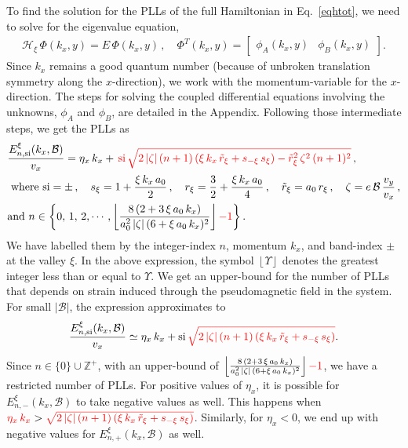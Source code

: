 \documentclass[aps,prb, onecolumn, nofootinbib, citeautoscript,10pt]{revtex4-2}
\newcommand{\red}[1]{{\color{red}#1}}
\def \nn{\nonumber \\}
\begin{document}
To find the solution for the PLLs of the full Hamiltonian in Eq.~\eqref{eqhtot}, we need to solve for the eigenvalue equation,
\begin{align}
\mathcal{H}_{\xi} \,\Phi (k_x, y) = E \,\Phi (k_x, y)\,,\quad
\Phi^T (k_x, y) = \begin{bmatrix}
\phi_A (k_x, y) & \phi_B(k_x, y) 
\end{bmatrix} .
\end{align}
Since $k_x$ remains a good quantum number (because of unbroken translation symmetry along the $x$-direction), we work with the momentum-variable for the $x$-direction. The steps for solving the coupled differential equations involving the unknowns, $\phi_A$ and $\phi_B$, are detailed in the Appendix. Following those intermediate steps, we get the PLLs as
\begin{align}
& \frac{  E^{\xi}_{n, \rm{si}} (k_x, \mathcal B) } {v_x} =  
\eta_x \,   k_x
+ \,\red{\text{si}\,\sqrt{ 2\,|\zeta|\,(n+1) \left (\xi\,k_x \, \tilde r_\xi + s_{-\xi} \, s_\xi \right ) - \tilde r_\xi^2 \, \zeta^2\,(n+1)^2 }}  \,,\nn
& \text{ where } \text{si} = \pm \,, \quad
s_\xi = 1 + \frac{\xi \, k_x\, a_0 } {2}\,, \quad
r_\xi = \frac{3}{2} + \frac{\xi \, k_x\, a_0 } {4}\,,\quad
\tilde{r}_\xi = a_0 \, r_\xi  \,, \quad \zeta =  e \, {\mathcal B} \, \frac{v_y}{v_x}\,,
\nn & \text{and } n \in \left\{ 0, \,1, \, 2,\cdots, 
\left\lfloor\frac{8 \,(2  + 3 \, \xi \,a_0\, k_x)}   { a_0^2\,|\zeta| \,(6 +\xi \,a_0\,  k_x)^2} \right\rfloor \red{- 1} \right\}.
\label{eqevals}
\end{align}
We have labelled them by the integer-index $n$, momentum $k_x$, and band-index $\pm$ at the valley $\xi$. 
In the above expression, the symbol $\left \lfloor  \Upsilon \right \rfloor$ denotes the greatest integer less than or equal to $\Upsilon$.
We get an upper-bound for the number of PLLs that depends on strain induced through the \red{pseudomagnetic} field in the system. For small $ |\mathcal{B}| $, the expression approximates to
\begin{align}
\frac{ E^{\xi}_{n, \rm{si}} (k_x, \mathcal B) } {v_x} \simeq    \eta_x \,   k_x 
+ \text{si}\, \red{\sqrt{ 2\,|\zeta|\,(n+1) \left (\xi\,k_x \, \tilde r_\xi + s_{-\xi} \, s_\xi \right ) }} .
\label{eqevalssmall}
\end{align}
Since $n\in \lbrace 0 \rbrace \cup \mathbb{Z}^+$, with an upper-bound of $
\left\lfloor\frac{8 \,(2  + 3 \, \xi \,a_0\, k_x)}   { a_0^2\,|\zeta| \,(6 +\xi \,a_0\,  k_x)^2} \right\rfloor \red{- 1}$, we have a restricted number of PLLs. For positive values of $\eta_x$, it is possible for $E^\xi_{n, -} (k_x, \mathcal B)$
to take negative values as well. This happens when $ \red{\eta_x \,  k_x}  > \red{\sqrt{2\,|\zeta|\,(n+1) \left (\xi\,k_x \, \tilde r_\xi + s_{-\xi} \, s_\xi \right )}} $. Similarly, for $\eta_x<0$, we end up with negative values for $ E^\xi_{n, +}
( k_x, \mathcal B )$ as well.
\end{document}
